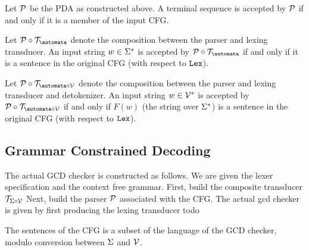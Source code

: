 \begin{definition}[Lexer]
\begin{theorem} 
    \label{thm:PDAEquivCFG}
    Let $\mathcal{P}$ be the PDA as constructed above. A terminal sequence is accepted by $\mathcal{P}$ if and only if it is a member of the input CFG.
\end{theorem}

\begin{theorem} 
    \label{thm:PDALexerEquivCFGLang}
    Let $\pushdown \circ \transducer_{\automata}$ denote the composition between the parser and lexing transducer.
    An input string $w \in \Sigma^{*}$ is accepted by $\pushdown \circ \transducer_{\automata}$ if and only if it is a sentence in the original CFG (with respect to $\mathtt{Lex}$).
\end{theorem}

\begin{theorem} 
    \label{thm:PDALexerDetokenizerEquivCFGLang}
    Let $\pushdown \circ \transducer_{\automata \circ \vocab}$ denote the composition between the parser and lexing transducer and detokenizer.
    An input string $w \in \mathcal{V}^{*}$ is accepted by $\pushdown \circ \transducer_{\automata \circ \vocab}$ if and only if $F(w)$ (the string over $\Sigma^{*}$) is a sentence in the original CFG (with respect to $\mathtt{Lex}$).
\end{theorem}

\subsection{Grammar Constrained Decoding}
\begin{definition}[GCDChecker]
    \label{def:GCDChecker}
    The actual GCD checker is constructed as follows. We are given the lexer specification and the context free grammar.
    First, build the composite transducer $\mathcal{T}_{\Sigma \circ \mathcal{V}}$
    Next, build the parser $\mathcal{P}$ associated with the CFG.
    The actual gcd checker is given by first producing the lexing transducer
    todo
\end{definition}

\begin{theorem}
    \label{thm:GrammarSubsetCheckerLang}
    The sentences of the CFG is a subset of the language of the GCD checker, modulo conversion between $\Sigma$ and $\mathcal{V}$.
\end{theorem}


\end{definition}
